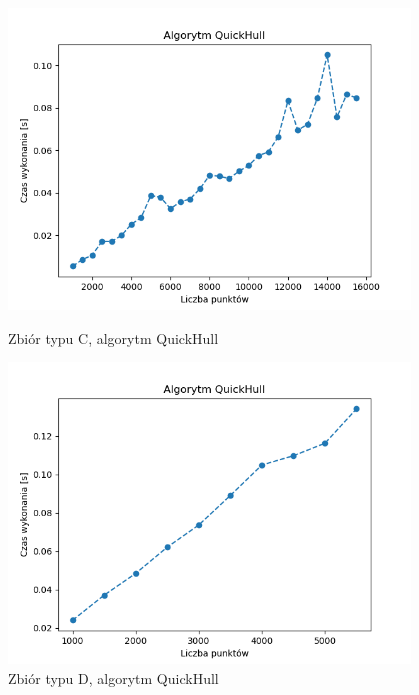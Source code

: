 \documentclass[11pt]{article}
\theoremstyle{remark} \newtheorem{definition}{def.}
\theoremstyle{definition} \newtheorem{twierdzenie}{tw.}
\begin{document}
\begin{figure}[]
    \centering
    \begin{minipage}{0.48\textwidth}
        \centering
        \includegraphics[width=0.95\textwidth]{../tests/prost-quickhull.png} %
        \caption{Zbiór typu C, algorytm QuickHull}
        \label{fig:prost-quickhull}
    \end{minipage}\hfill
    \begin{minipage}{0.48\textwidth}
        \centering
        \includegraphics[width=0.95\textwidth]{../tests/kw-quickhull.png} %
        \caption{Zbiór typu D, algorytm QuickHull}
        \label{fig:kw-quickhull}
    \end{minipage}
\end{figure}
\end{document}
